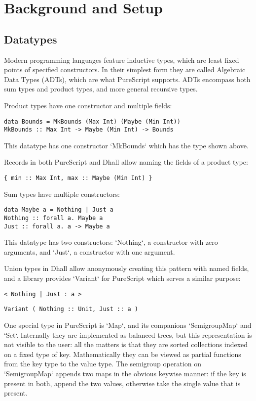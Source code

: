 \documentclass[11pt, twoside, reqno]{book}
\begin{document}
\chapter{Background and Setup}

\section{Datatypes}

Modern programming languages feature inductive types, which are least fixed points of specified constructors.
In their simplest form they are called Algebraic Data Types (ADTs), which are what PureScript supports.
ADTs encompass both sum types and product types, and more general recursive types.

Product types have one constructor and multiple fields:
\begin{verbatim}
data Bounds = MkBounds (Max Int) (Maybe (Min Int))
MkBounds :: Max Int -> Maybe (Min Int) -> Bounds
\end{verbatim}
This datatype has one constructor \inHS`MkBounds` which has the type shown above.

Records in both PureScript and Dhall allow naming the fields of a product type:
\begin{verbatim}
{ min :: Max Int, max :: Maybe (Min Int) }
\end{verbatim}

Sum types have multiple constructors:
\begin{verbatim}
data Maybe a = Nothing | Just a
Nothing :: forall a. Maybe a
Just :: forall a. a -> Maybe a
\end{verbatim}
This datatype has two constructors: \inHS`Nothing`, a constructor with zero arguments, and \inHS`Just`, a constructor with one argument.

Union types in Dhall allow anonymously creating this pattern with named fields, and a library provides \inHS`Variant` for PureScript which serves a similar purpose:
\begin{verbatim}
< Nothing | Just : a >
\end{verbatim}
\begin{verbatim}
Variant ( Nothing :: Unit, Just :: a )
\end{verbatim}

One special type in PureScript is \inHS`Map`, and its companions \inHS`SemigroupMap` and \inHS`Set`.
Internally they are implemented as balanced trees, but this representation is not visible to the user: all the matters is that they are sorted collections indexed on a fixed type of key.
Mathematically they can be viewed as partial functions from the key type to the value type.
The semigroup operation on \inHS`SemigroupMap` appends two maps in the obvious keywise manner: if the key is present in both, append the two values, otherwise take the single value that is present.
\end{document}
